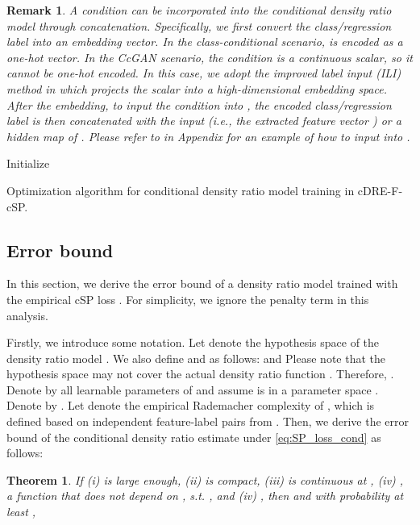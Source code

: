 \documentclass[final,12pt, 3p,times]{elsarticle}
\newtheorem{theorem}{Theorem}
\newtheorem{remark}{Remark}
\begin{document}
\begin{remark}\label{rmk:how_to_input_condition}
    A condition  can be incorporated into the conditional density ratio model  through concatenation. Specifically, we first convert the class/regression label  into an embedding vector. In the class-conditional scenario,  is encoded as a one-hot vector. In the CcGAN scenario, the condition  is a continuous scalar, so it cannot be one-hot encoded. In this case, we adopt the \textit{improved label input} (ILI) method in \cite{ding2020continuous} which projects the scalar  into a high-dimensional embedding space. After the embedding, to input the condition into , the encoded class/regression label is then concatenated with the input (i.e., the extracted feature vector ) or a hidden map of . Please refer to  in Appendix for an example of how to input  into .
\end{remark}


\begin{algorithm}[t] \footnotesize
	\SetAlgoLined
	Initialize \;
	\caption{Optimization algorithm for conditional density ratio model training in cDRE-F-cSP.}
	\label{alg:cDRE-F-cSP}
\end{algorithm}



\subsection{Error bound}\label{sec:cDRE_error_bound}
In this section, we derive the error bound of a density ratio model  trained with the empirical cSP loss . For simplicity, we ignore the penalty term in this analysis. 

Firstly, we introduce some notation. Let  denote the hypothesis space of the density ratio model . We also define  and  as follows:
 and 
Please note that the hypothesis space  may not cover the actual density ratio function . Therefore, . Denote by  all learnable parameters of  and assume  is in a parameter space . Denote  by . Let  denote the empirical Rademacher complexity \cite{mohri2018foundations} of , which is defined based on independent feature-label pairs  from . Then,
we derive the error bound of the conditional density ratio estimate  under \cref{eq:SP_loss_cond} as follows:
\begin{theorem}
	\label{thm:error_bound}
	If (i)  is large enough, (ii)  is compact, (iii)  is continuous at , (iv) ,  a function  that does not depend on , s.t. , and (iv) , then  and  with probability at least ,


    
\end{theorem}
\end{document}
